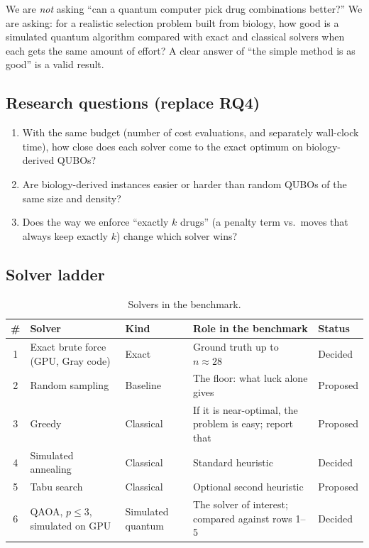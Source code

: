 \begin{plain}
We are \emph{not} asking ``can a quantum computer pick drug combinations
better?'' We are asking: for a realistic selection problem built from
biology, how good is a simulated quantum algorithm compared with exact and
classical solvers when each gets the same amount of effort? A clear answer of
``the simple method is as good'' is a valid result.
\end{plain}

\subsection{Research questions (replace RQ4)}

\begin{enumerate}[label=\textbf{RQ4\alph*.},leftmargin=*]
  \item With the same budget (number of cost evaluations, and separately
        wall-clock time), how close does each solver come to the exact
        optimum on biology-derived QUBOs?
  \item Are biology-derived instances easier or harder than random QUBOs of
        the same size and density?
  \item Does the way we enforce ``exactly $k$ drugs'' (a penalty term vs.\
        moves that always keep exactly $k$) change which solver wins?
\end{enumerate}

\subsection{Solver ladder}

\begin{table}[!ht]
\centering
\small
\begin{tabularx}{\linewidth}{@{}c>{\raggedright\arraybackslash}p{3.4cm}>{\raggedright\arraybackslash}p{2.4cm}>{\raggedright\arraybackslash}Xl@{}}
\toprule
\# & Solver & Kind & Role in the benchmark & Status \\
\midrule
1 & Exact brute force (GPU, Gray code) & Exact & Ground truth up to $n\approx 28$ & Decided \\
2 & Random sampling & Baseline & The floor: what luck alone gives & Proposed \\
3 & Greedy & Classical & If it is near-optimal, the problem is easy; report that & Proposed \\
4 & Simulated annealing~\cite{kirkpatrick1983optimization} & Classical & Standard heuristic & Decided \\
5 & Tabu search & Classical & Optional second heuristic & Proposed \\
6 & QAOA, $p\le 3$, simulated on GPU & Simulated quantum & The solver of interest; compared against rows 1--5 & Decided \\
\bottomrule
\end{tabularx}
\caption{Solvers in the benchmark.}
\end{table}

